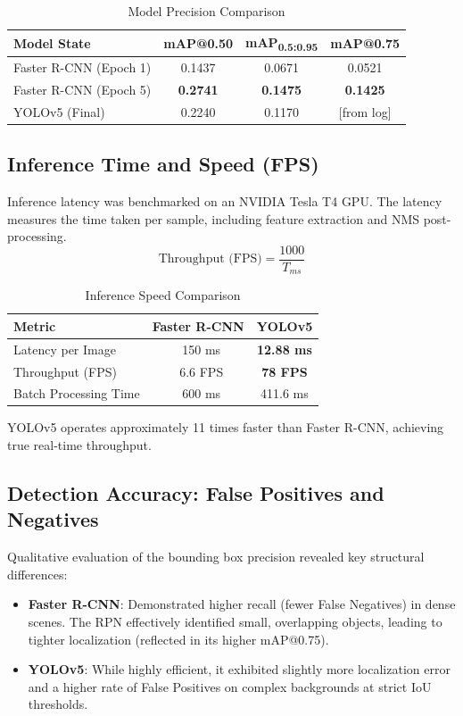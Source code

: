 \documentclass[conference]{IEEEtran}
\begin{document}
\begin{table}[H]
\centering
\caption{Model Precision Comparison}
\label{tab:map}
\begin{tabular}{lccc}
\toprule
\textbf{Model State} & \textbf{mAP@0.50} & \textbf{mAP\textsubscript{0.5:0.95}} & \textbf{mAP@0.75} \\
\midrule
Faster R-CNN (Epoch 1) & 0.1437 & 0.0671 & 0.0521 \\
Faster R-CNN (Epoch 5) & \textbf{0.2741} & \textbf{0.1475} & \textbf{0.1425} \\
YOLOv5 (Final) & 0.2240 & 0.1170 & [from log] \\
\bottomrule
\end{tabular}
\end{table}

\subsection{Inference Time and Speed (FPS)}
Inference latency was benchmarked on an NVIDIA Tesla T4 GPU. The latency measures the time taken per sample, including feature extraction and NMS post-processing.
\begin{equation}
    \text{Throughput (FPS)} = \frac{1000}{T_{ms}}
\end{equation}

\begin{table}[H]
\centering
\caption{Inference Speed Comparison}
\label{tab:speed}
\begin{tabular}{lcc}
\toprule
\textbf{Metric} & \textbf{Faster R-CNN} & \textbf{YOLOv5} \\
\midrule
Latency per Image & ~150 ms & \textbf{12.88 ms} \\
Throughput (FPS) & ~6.6 FPS & \textbf{78 FPS} \\
Batch Processing Time & ~600 ms & 411.6 ms \\
\bottomrule
\end{tabular}
\end{table}
YOLOv5 operates approximately 11 times faster than Faster R-CNN, achieving true real-time throughput.

\subsection{Detection Accuracy: False Positives and Negatives}
Qualitative evaluation of the bounding box precision revealed key structural differences:
\begin{itemize}
    \item \textbf{Faster R-CNN}: Demonstrated higher recall (fewer False Negatives) in dense scenes. The RPN effectively identified small, overlapping objects, leading to tighter localization (reflected in its higher mAP@0.75).
    \item \textbf{YOLOv5}: While highly efficient, it exhibited slightly more localization error and a higher rate of False Positives on complex backgrounds at strict IoU thresholds.
\end{itemize}
\end{document}
